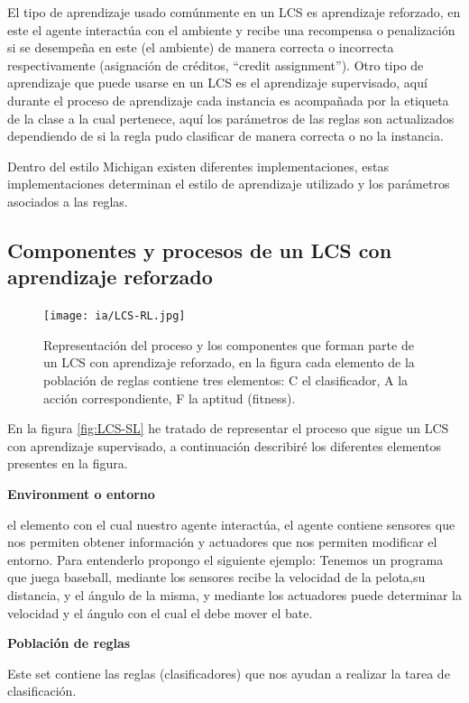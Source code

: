 \documentclass[11pt,fleqn]{book} %
\begin{document}
El tipo de aprendizaje usado comúnmente en un LCS es aprendizaje reforzado, en este el agente interactúa con el ambiente y recibe una recompensa o penalización si se desempeña en este (el ambiente) de manera correcta o incorrecta respectivamente (asignación de créditos, “credit assignment”). Otro tipo de aprendizaje que puede usarse en un LCS es el aprendizaje supervisado, aquí durante el proceso de aprendizaje cada instancia es acompañada por la etiqueta de la clase a la cual pertenece, aquí los parámetros de las reglas son actualizados dependiendo de si la regla pudo clasificar de manera correcta o no la instancia.

Dentro del estilo Michigan existen diferentes implementaciones, estas implementaciones determinan el estilo de aprendizaje utilizado y los parámetros asociados a las reglas.

\subsection{Componentes y procesos de un LCS con aprendizaje reforzado} 

\begin{figure}[ht]
\centering\texttt{[image: ia/LCS-RL.jpg]}
\caption{Representación del proceso y los componentes que forman parte de un LCS con aprendizaje reforzado, en la figura cada elemento de la población de reglas contiene tres elementos: {C} el clasificador, {A} la acción correspondiente, { F } la aptitud (fitness).}
\label{fig:LCS-RL} 
\end{figure}

En la figura \ref{fig:LCS-SL} he tratado de representar el proceso que sigue un LCS con aprendizaje supervisado, a continuación describiré los diferentes elementos presentes en la figura.

\clearpage
\textbf{Environment o entorno}

 el elemento con el cual nuestro agente interactúa, el agente contiene sensores que nos permiten obtener información y actuadores que nos permiten modificar el entorno. Para entenderlo propongo el siguiente ejemplo: Tenemos un programa que juega baseball, mediante los sensores recibe la velocidad de la pelota,su distancia, y el ángulo de la misma, y mediante los actuadores puede determinar la velocidad y el ángulo con el cual el debe mover el bate.

\textbf{Población de reglas}

Este set contiene las reglas (clasificadores) que nos ayudan a realizar la tarea de clasificación. 
\end{document}
